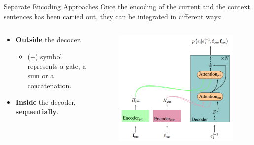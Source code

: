 \begin{frame}{Separate Encoding Approaches}
	Once the encoding of the current and the context sentences has been carried out, they can be integrated in different ways:
	\begin{columns}[T] %
		\begin{column}{.50\textwidth}
			\begin{itemize}
				\item \textbf{Outside} the decoder.
					\begin{itemize}
						\item (+) symbol represents a gate, a sum or a concatenation.
					\end{itemize}
				\item \textbf{Inside} the decoder, \textbf{sequentially}. 
			\end{itemize}
		\end{column}%
		\hfill%
		\begin{column}{.50\textwidth}
			\begin{figure}
				\centering
				\includegraphics[width=0.90\linewidth]{Images/models_inside_decoder_sequential}
				\label{fig:modelsoutidedecoder}
			\end{figure}
		\end{column}%
	\end{columns} 
\end{frame}

